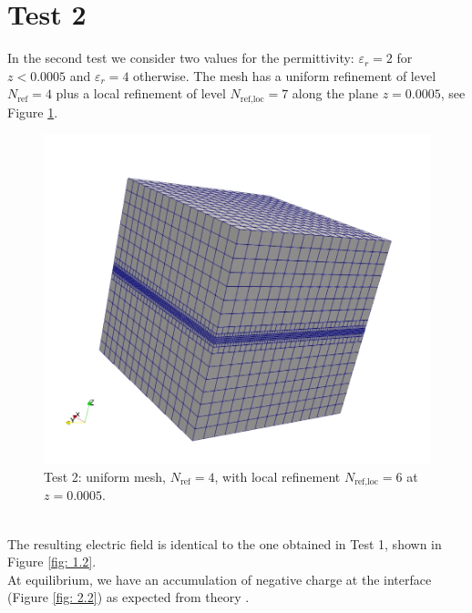 \documentclass{Configuration_Files/PoliMi3i_thesis}
\let\epsilon\varepsilon
\begin{document}
\section{Test 2}
In the second test we consider two values for the permittivity: $\epsilon_r=2$ for $z<0.0005$ and $\epsilon_r=4$ otherwise.
The mesh has a uniform refinement of level $N_\text{ref}=4$ plus a local refinement of level $N_\text{ref,loc}=7$ along the plane $z=0.0005$, see Figure \ref{fig: 2.1}.
\begin{figure}[h!]
    \centering
   \includegraphics[scale=0.25]{Images/2.grid.jpeg}
    \caption {Test 2: uniform mesh, $N_\text{ref}=4$, with local refinement $N_\text{ref,loc}=6$ at $z=0.0005$.}
    \label{fig: 2.1}
\end{figure}
\\The resulting electric field is identical to the one obtained in Test 1, shown in Figure \ref{fig: 1.2}. 
\\At equilibrium, we have an accumulation of negative charge at the interface (Figure \ref{fig: 2.2}) as expected from theory \cite{charge}.
\end{document}
